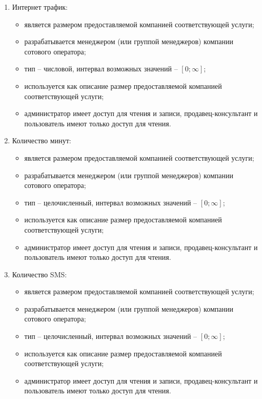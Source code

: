 \begin{enumerate}
\begin{enumerate}
        \item Интернет трафик:
        \begin{itemize}
            \item является размером предоставляемой компанией соответствующей услуги;
            \item разрабатывается менеджером (или группой менеджеров) компании сотового оператора;
            \item тип -- числовой, интервал возможных значений -- $[0; \infty]$; %
            \item используется как описание размер предоставляемой компанией соответствующей услуги;
            \item администратор имеет доступ для чтения и записи, продавец-консультант и пользователь имеют только доступ для чтения.
        \end{itemize}

        \item Количество минут:
        \begin{itemize}
            \item является размером предоставляемой компанией соответствующей услуги;
            \item разрабатывается менеджером (или группой менеджеров) компании сотового оператора;
            \item тип -- целочисленный, интервал возможных значений -- $[0; \infty]$; %
            \item используется как описание размер предоставляемой компанией соответствующей услуги;
            \item администратор имеет доступ для чтения и записи, продавец-консультант и пользователь имеют только доступ для чтения.
        \end{itemize}

        \item Количество SMS:
        \begin{itemize}
            \item является размером предоставляемой компанией соответствующей услуги;
            \item разрабатывается менеджером (или группой менеджеров) компании сотового оператора;
            \item тип -- целочисленный, интервал возможных значений -- $[0; \infty]$; %
            \item используется как описание размер предоставляемой компанией соответствующей услуги;
            \item администратор имеет доступ для чтения и записи, продавец-консультант и пользователь имеют только доступ для чтения.
        \end{itemize}
    \end{enumerate}


\end{enumerate}
